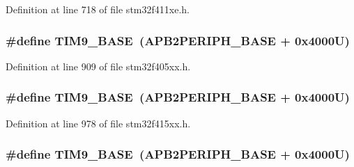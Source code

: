 Definition at line 718 of file stm32f411xe.\+h.

\subsubsection[{\texorpdfstring{T\+I\+M9\+\_\+\+B\+A\+SE}{TIM9_BASE}}]{\setlength{\rightskip}{0pt plus 5cm}\#define T\+I\+M9\+\_\+\+B\+A\+SE~({\bf A\+P\+B2\+P\+E\+R\+I\+P\+H\+\_\+\+B\+A\+SE} + 0x4000\+U)}\hypertarget{group___peripheral__registers__structures_ga92ae902be7902560939223dd765ece08}{}\label{group___peripheral__registers__structures_ga92ae902be7902560939223dd765ece08}


Definition at line 909 of file stm32f405xx.\+h.

\subsubsection[{\texorpdfstring{T\+I\+M9\+\_\+\+B\+A\+SE}{TIM9_BASE}}]{\setlength{\rightskip}{0pt plus 5cm}\#define T\+I\+M9\+\_\+\+B\+A\+SE~({\bf A\+P\+B2\+P\+E\+R\+I\+P\+H\+\_\+\+B\+A\+SE} + 0x4000\+U)}\hypertarget{group___peripheral__registers__structures_ga92ae902be7902560939223dd765ece08}{}\label{group___peripheral__registers__structures_ga92ae902be7902560939223dd765ece08}


Definition at line 978 of file stm32f415xx.\+h.

\subsubsection[{\texorpdfstring{T\+I\+M9\+\_\+\+B\+A\+SE}{TIM9_BASE}}]{\setlength{\rightskip}{0pt plus 5cm}\#define T\+I\+M9\+\_\+\+B\+A\+SE~({\bf A\+P\+B2\+P\+E\+R\+I\+P\+H\+\_\+\+B\+A\+SE} + 0x4000\+U)}\hypertarget{group___peripheral__registers__structures_ga92ae902be7902560939223dd765ece08}{}\label{group___peripheral__registers__structures_ga92ae902be7902560939223dd765ece08}


